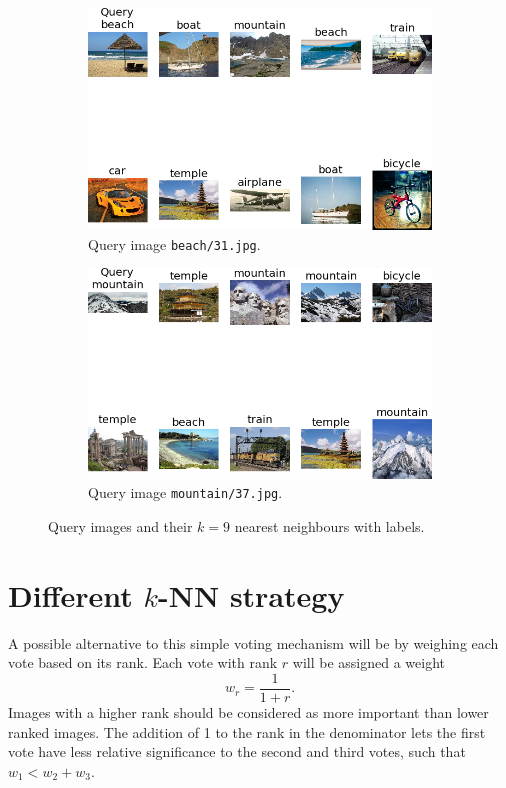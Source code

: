 \documentclass[a4paper,10pt]{article}
\begin{document}
\begin{figure}
  \begin{subfigure}{.47\textwidth}
    \centering
    \includegraphics[width=1\textwidth]{knn_beach31}
    \caption{Query image \texttt{beach/31.jpg}.}
  \end{subfigure}
  \hspace*{\fill}
  \begin{subfigure}{.47\textwidth}
    \centering
    \includegraphics[width=1\textwidth]{knn_mountain37}
    \caption{Query image \texttt{mountain/37.jpg}.}
  \end{subfigure}
  \caption{Query images and their $k=9$ nearest neighbours with labels.}
  \label{f:knns}
\end{figure}

\section{Different $k$-NN strategy}
A possible alternative to this simple voting mechanism will be by weighing each vote based on its rank.  Each vote with rank $r$ will be assigned a weight \[ w_r = \frac{1}{1+r}. \]  Images with a higher rank should be considered as more important than lower ranked images.  The addition of 1 to the rank in the denominator lets the first vote have less relative significance to the second and third votes, such that $w_1 < w_2 + w_3$.
\end{document}

